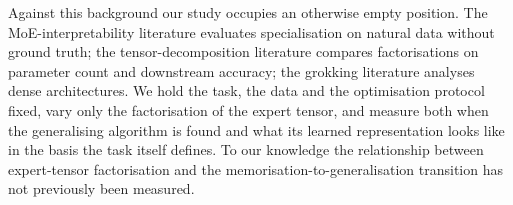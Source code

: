 Against this background our study occupies an otherwise empty position. The
MoE-interpretability literature evaluates specialisation on natural data
without ground truth; the tensor-decomposition literature compares
factorisations on parameter count and downstream accuracy; the grokking
literature analyses dense architectures. We hold the task, the data and the
optimisation protocol fixed, vary only the factorisation of the expert tensor,
and measure both when the generalising algorithm is found and what its learned
representation looks like in the basis the task itself defines. To our
knowledge the relationship between expert-tensor factorisation and the
memorisation-to-generalisation transition has not previously been measured.
